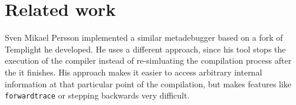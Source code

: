 
\chapter{Related work}

Sven Mikael Persson implemented a similar metadebugger based on a fork of
Templight he developed.\cite{persson-templight} He uses a different approach,
since his tool stops the execution of the compiler instead of re-simluating
the compilation process after the it finishes. His approach makes it easier to
access arbitrary internal information at that particular point of the
compilation, but makes features like \texttt{forwardtrace} or stepping
 backwards very difficult.
